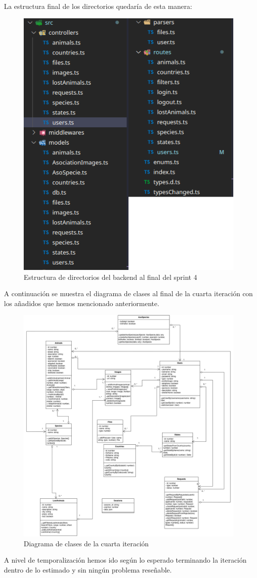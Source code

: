 La estructura final de los directorios quedaría de esta manera:
\begin{figure}[H]
	\centering
	\includegraphics[width=0.7\linewidth]{"sprint 4/directorios"}
	\caption{Estructura de directorios del backend al final del sprint 4}
	\label{fig:directorios4}
\end{figure}

A continuación se muestra el diagrama de clases al final de la cuarta iteración con los añadidos que hemos mencionado anteriormente.


\begin{figure}[H]
	\centering
	\includegraphics[width=1\linewidth]{"sprint 4/clases"}
	\caption{Diagrama de clases de la cuarta iteración}
	\label{fig:clasesCuarta}
\end{figure}

A nivel de temporalización hemos ido según lo esperado terminando la iteración dentro de lo estimado y sin ningún problema reseñable.















